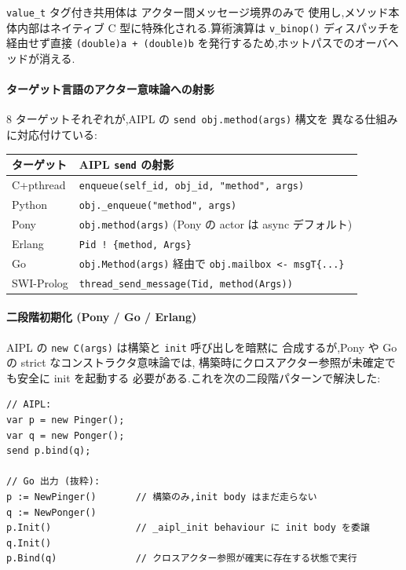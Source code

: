 \documentclass[11pt,a4paper]{article}
\newcommand{\code}[1]{\texttt{\small #1}}
\begin{document}
\code{value\_t} タグ付き共用体は アクター間メッセージ境界のみで
使用し,メソッド本体内部はネイティブ C 型に特殊化される.算術演算は
\code{v\_binop()} ディスパッチを経由せず直接 \code{(double)a + (double)b}
を発行するため,ホットパスでのオーバヘッドが消える.

\paragraph{ターゲット言語のアクター意味論への射影}

8 ターゲットそれぞれが,AIPL の \code{send obj.method(args)} 構文を
異なる仕組みに対応付けている:

\begin{tabularx}{\linewidth}{l X}
  \toprule
  \textbf{ターゲット} & \textbf{AIPL \texttt{send} の射影} \\
  \midrule
  C+pthread     & \code{enqueue(self\_id, obj\_id, "method", args)} \\
  Python        & \code{obj.\_enqueue("method", args)} \\
  Pony          & \code{obj.method(args)} (Pony の actor は async デフォルト) \\
  Erlang        & \code{Pid ! \{method, Args\}} \\
  Go            & \code{obj.Method(args)} 経由で \code{obj.mailbox <- msgT\{...\}} \\
  SWI-Prolog    & \code{thread\_send\_message(Tid, method(Args))} \\
  \bottomrule
\end{tabularx}

\paragraph{二段階初期化 (Pony / Go / Erlang)}
AIPL の \code{new C(args)} は構築と \code{init} 呼び出しを暗黙に
合成するが,Pony や Go の strict なコンストラクタ意味論では,
構築時にクロスアクター参照が未確定でも安全に init を起動する
必要がある.これを次の二段階パターンで解決した:

\begin{lstlisting}
// AIPL:
var p = new Pinger();
var q = new Ponger();
send p.bind(q);

// Go 出力 (抜粋):
p := NewPinger()       // 構築のみ,init body はまだ走らない
q := NewPonger()
p.Init()               // _aipl_init behaviour に init body を委譲
q.Init()
p.Bind(q)              // クロスアクター参照が確実に存在する状態で実行
\end{lstlisting}
\end{document}
